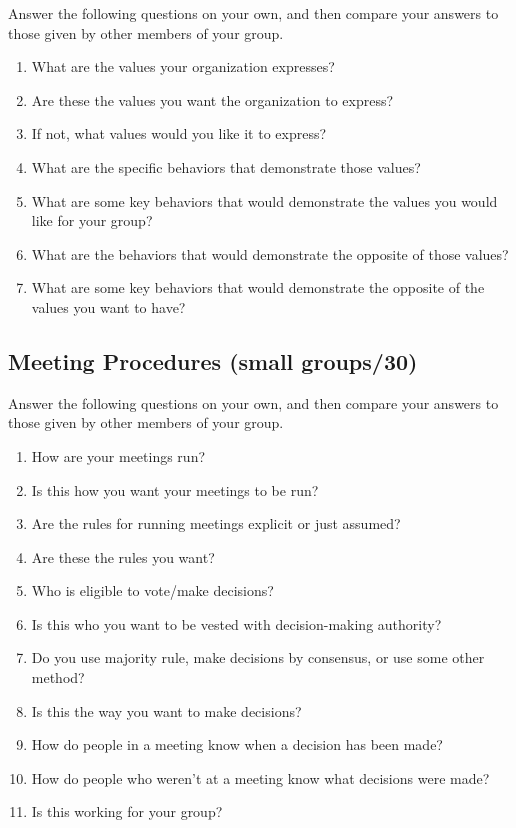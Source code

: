 Answer the following questions on your own, and then compare your
answers to those given by other members of your group.

\begin{enumerate}
\item
  What are the values your organization expresses?
\item
  Are these the values you want the organization to express?
\item
  If not, what values would you like it to express?
\item
  What are the specific behaviors that demonstrate those values?
\item
  What are some key behaviors that would demonstrate the values you
  would like for your group?
\item
  What are the behaviors that would demonstrate the opposite of those
  values?
\item
  What are some key behaviors that would demonstrate the opposite of
  the values you want to have?
\end{enumerate}

\subsection*{Meeting Procedures (small groups/30)}

Answer the following questions on your own, and then compare your
answers to those given by other members of your group.

\begin{enumerate}
\item
  How are your meetings run?
\item
  Is this how you want your meetings to be run?
\item
  Are the rules for running meetings explicit or just assumed?
\item
  Are these the rules you want?
\item
  Who is eligible to vote/make decisions?
\item
  Is this who you want to be vested with decision-making authority?
\item
  Do you use majority rule, make decisions by consensus, or use some
  other method?
\item
  Is this the way you want to make decisions?
\item
  How do people in a meeting know when a decision has been made?
\item
  How do people who weren't at a meeting know what decisions were
  made?
\item
  Is this working for your group?
\end{enumerate}

